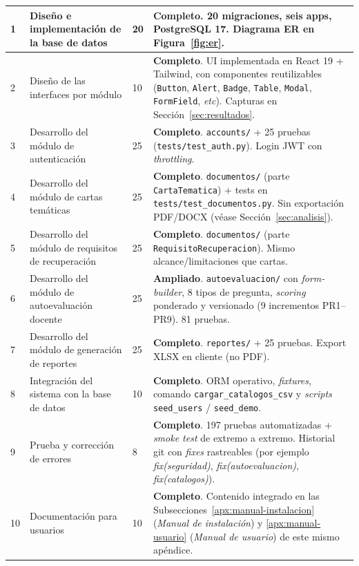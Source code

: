 \begin{longtable}{p{} p{} p{} p{}}
    1 & Diseño e implementación de la base de datos & 20 & \textbf{Completo}. 20 migraciones, seis apps, PostgreSQL 17. Diagrama ER en Figura~\ref{fig:er}. \\
    \midrule
    2 & Diseño de las interfaces por módulo & 10 & \textbf{Completo}. UI implementada en React 19 + Tailwind, con componentes reutilizables (\texttt{Button}, \texttt{Alert}, \texttt{Badge}, \texttt{Table}, \texttt{Modal}, \texttt{FormField}, \emph{etc}). Capturas en Sección~\ref{sec:resultados}. \\
    \midrule
    3 & Desarrollo del módulo de autenticación & 25 & \textbf{Completo}. \texttt{accounts/} + 25 pruebas (\texttt{tests/test\_auth.py}). Login JWT con \emph{throttling}. \\
    \midrule
    4 & Desarrollo del módulo de cartas temáticas & 25 & \textbf{Completo}. \texttt{documentos/} (parte \texttt{CartaTematica}) + tests en \texttt{tests/test\_documentos.py}. Sin exportación PDF/DOCX (véase Sección~\ref{sec:analisis}). \\
    \midrule
    5 & Desarrollo del módulo de requisitos de recuperación & 25 & \textbf{Completo}. \texttt{documentos/} (parte \texttt{RequisitoRecuperacion}). Mismo alcance/limitaciones que cartas. \\
    \midrule
    6 & Desarrollo del módulo de autoevaluación docente & 25 & \textbf{Ampliado}. \texttt{autoevaluacion/} con \emph{form-builder}, 8 tipos de pregunta, \emph{scoring} ponderado y versionado (9 incrementos PR1--PR9). 81 pruebas. \\
    \midrule
    7 & Desarrollo del módulo de generación de reportes & 25 & \textbf{Completo}. \texttt{reportes/} + 25 pruebas. Export XLSX en cliente (no PDF). \\
    \midrule
    8 & Integración del sistema con la base de datos & 10 & \textbf{Completo}. ORM operativo, \emph{fixtures}, comando \texttt{cargar\_catalogos\_csv} y \emph{scripts} \texttt{seed\_users} / \texttt{seed\_demo}. \\
    \midrule
    9 & Prueba y corrección de errores & 8 & \textbf{Completo}. 197 pruebas automatizadas + \emph{smoke test} de extremo a extremo. Historial git con \emph{fixes} rastreables (por ejemplo \emph{fix(seguridad)}, \emph{fix(autoevaluacion)}, \emph{fix(catalogos)}). \\
    \midrule
    10 & Documentación para usuarios & 10 & \textbf{Completo}. Contenido integrado en las Subsecciones~\ref{apx:manual-instalacion} (\emph{Manual de instalación}) y \ref{apx:manual-usuario} (\emph{Manual de usuario}) de este mismo apéndice. \\

\end{longtable}
